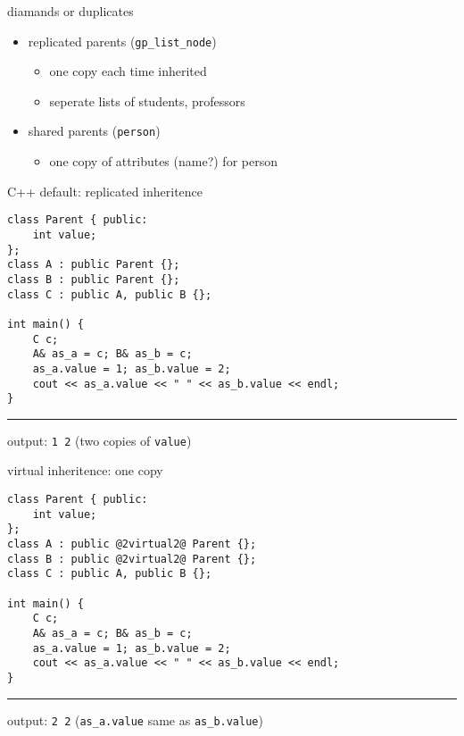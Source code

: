 \usetikzlibrary{graphs}
\usetikzlibrary{graphdrawing}

\begin{frame}[fragile,label=diamOrDup]{diamands or duplicates}
\lstset{language=C++,style=small}
\begin{itemize}
\item replicated parents (\texttt{gp\_list\_node})
    \begin{itemize}
    \item one copy each time inherited
    \item seperate lists of students, professors
    \end{itemize}
\item shared parents (\texttt{person})
    \begin{itemize}
    \item one copy of attributes (name?) for person
    \end{itemize}
\end{itemize}
\end{frame}

\begin{frame}[fragile,label=virtualNoCopy]{C++ default: replicated inheritence}
\lstset{language=C++,style=smaller}
\begin{lstlisting}
class Parent { public:
    int value;
};
class A : public Parent {}; 
class B : public Parent {}; 
class C : public A, public B {}; 

int main() {
    C c;
    A& as_a = c; B& as_b = c;
    as_a.value = 1; as_b.value = 2;
    cout << as_a.value << " " << as_b.value << endl;
}
\end{lstlisting}
\hrule
output: \texttt{1 2} (two copies of \texttt{value})
\end{frame}

\begin{frame}[fragile,label=virtualCopy]{virtual inheritence: one copy}
\begin{lstlisting}
class Parent { public:
    int value;
};
class A : public @2virtual2@ Parent {}; 
class B : public @2virtual2@ Parent {}; 
class C : public A, public B {}; 

int main() {
    C c;
    A& as_a = c; B& as_b = c;
    as_a.value = 1; as_b.value = 2;
    cout << as_a.value << " " << as_b.value << endl;
}
\end{lstlisting}
\hrule
output: \texttt{2 2} (\texttt{as\_a.value} same as \texttt{as\_b.value})
\end{frame}

